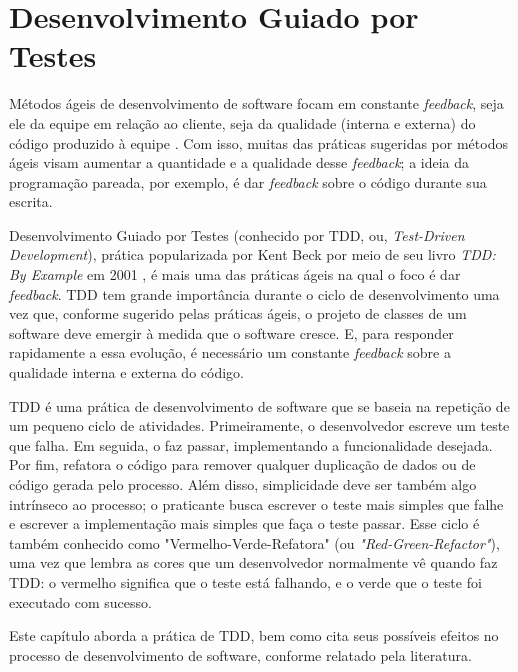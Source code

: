 \chapter{Desenvolvimento Guiado por Testes}
\label{cap:tdd}

Métodos ágeis de desenvolvimento de software focam em constante
\textit{feedback}, seja ele da equipe em relação ao cliente, seja da
qualidade (interna e externa) do código produzido à equipe \cite{AgileManifesto}.
Com isso, muitas das práticas sugeridas por métodos ágeis visam aumentar a 
quantidade e a qualidade desse \textit{feedback}; a ideia da programação pareada, por
exemplo, é dar \textit{feedback} sobre o código durante sua escrita.

Desenvolvimento Guiado por Testes (conhecido por TDD, ou, \textit{Test-Driven
Development}), prática popularizada por Kent Beck por meio de seu livro
\textit{TDD: By Example} em 2001 \cite{TDDByExample}, é mais uma das práticas 
ágeis na qual o foco é dar \textit{feedback}. TDD tem grande importância durante o ciclo
de desenvolvimento uma vez que, conforme sugerido pelas práticas ágeis, o projeto de classes de um
software deve emergir à medida que o software cresce. E, para responder
rapidamente a essa evolução, é necessário um constante \textit{feedback} sobre a
qualidade interna e externa do código.

TDD é uma prática de desenvolvimento de software que se baseia na repetição de
um pequeno ciclo de atividades. Primeiramente, o desenvolvedor escreve um
teste que falha. Em seguida, o faz passar, implementando a
funcionalidade desejada. Por fim, refatora o código para remover qualquer
duplicação de dados ou de código gerada pelo processo.
Além disso, simplicidade deve ser também algo intrínseco ao processo; o praticante
busca escrever o teste mais simples que falhe e escrever a implementação mais simples
que faça o teste passar.
Esse ciclo
é também conhecido como 
"Vermelho-Verde-Refatora" (ou \textit{"Red-Green-Refactor"}), uma vez que lembra as cores que um 
desenvolvedor normalmente vê quando faz TDD: o vermelho significa que
o teste está falhando, e o verde que o teste foi executado com sucesso.

Este capítulo aborda a prática de TDD, bem como cita
seus possíveis efeitos no processo de desenvolvimento de software, conforme relatado pela
literatura.

